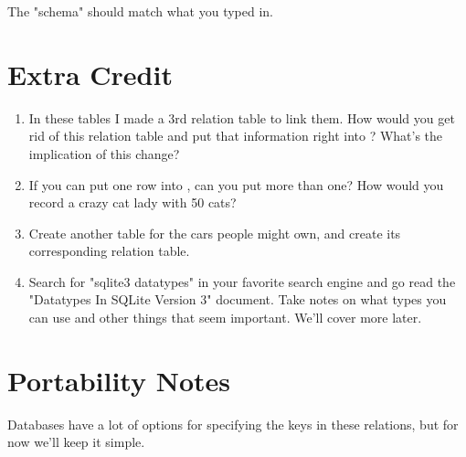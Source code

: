The "schema" should match what you typed in.

\section{Extra Credit}

\begin{enumerate}
\item In these tables I made a 3rd relation table to link them.  How would you
    get rid of this relation table  and put that
    information right into ?  What's the implication of this
    change?
\item If you can put one row into , can you put more than
    one?  How would you record a crazy cat lady with 50 cats?
\item Create another table for the cars people might own, and create its
    corresponding relation table.
\item Search for "sqlite3 datatypes" in your favorite search engine and 
    go read the "Datatypes In SQLite Version 3" document.  Take notes on
    what types you can use and other things that seem important.  We'll
    cover more later.
\end{enumerate}

\section{Portability Notes}

Databases have a lot of options for specifying the keys in these relations,
but for now we'll keep it simple.

